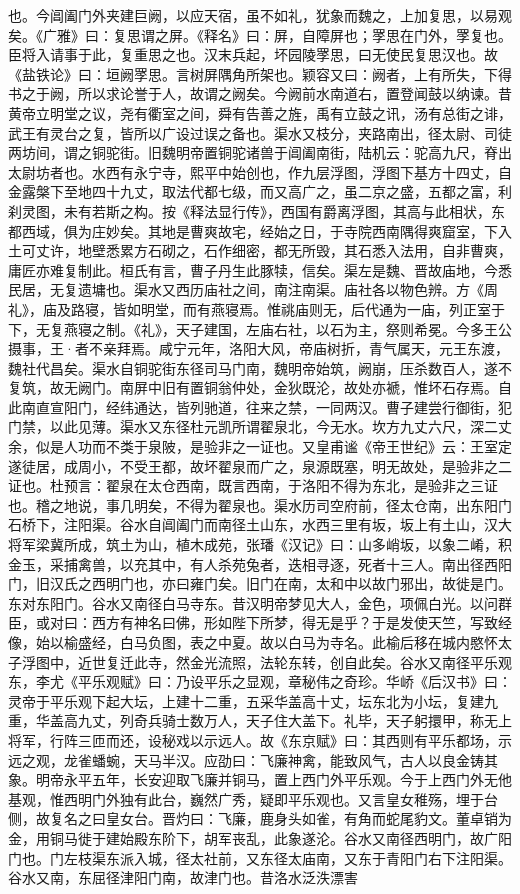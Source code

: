 \documentclass[12pt,UTF8]{ctexbook}
\begin{document}
也。今阊阖门外夹建巨阙，以应天宿，虽不如礼，犹象而魏之，上加复思，以易观矣。《广雅》曰：复思谓之屏。《释名》曰：屏，自障屏也；罦思在门外，罦复也。臣将入请事于此，复重思之也。汉末兵起，坏园陵罦思，曰无使民复思汉也。故《盐铁论》曰：垣阙罦思。言树屏隅角所架也。颖容又曰：阙者，上有所失，下得书之于阙，所以求论誉于人，故谓之阙矣。今阙前水南道右，置登闻鼓以纳谏。昔黄帝立明堂之议，尧有衢室之间，舜有告善之旌，禹有立鼓之讯，汤有总街之诽，武王有灵台之复，皆所以广设过误之备也。渠水又枝分，夹路南出，径太尉、司徒两坊间，谓之铜驼街。旧魏明帝置铜驼诸兽于阊阖南街，陆机云：驼高九尺，脊出太尉坊者也。水西有永宁寺，熙平中始创也，作九层浮图，浮图下基方十四丈，自金露槃下至地四十九丈，取法代都七级，而又高广之，虽二京之盛，五都之富，利刹灵图，未有若斯之构。按《释法显行传》，西国有爵离浮图，其高与此相状，东都西域，俱为庄妙矣。其地是曹爽故宅，经始之日，于寺院西南隅得爽窟室，下入土可丈许，地壁悉累方石砌之，石作细密，都无所毁，其石悉入法用，自非曹爽，庸匠亦难复制此。桓氏有言，曹子丹生此豚犊，信矣。渠左是魏、晋故庙地，今悉民居，无复遗墉也。渠水又西历庙社之间，南注南渠。庙社各以物色辨。方《周礼》，庙及路寝，皆如明堂，而有燕寝焉。惟祧庙则无，后代通为一庙，列正室于下，无复燕寝之制。《礼》，天子建国，左庙右社，以石为主，祭则希冕。今多王公摄事，王·者不亲拜焉。咸宁元年，洛阳大风，帝庙树折，青气属天，元王东渡，魏社代昌矣。渠水自铜驼街东径司马门南，魏明帝始筑，阙崩，压杀数百人，遂不复筑，故无阙门。南屏中旧有置铜翁仲处，金狄既沦，故处亦褫，惟坏石存焉。自此南直宣阳门，经纬通达，皆列驰道，往来之禁，一同两汉。曹子建尝行御街，犯门禁，以此见薄。渠水又东径杜元凯所谓翟泉北，今无水。坎方九丈六尺，深二丈余，似是人功而不类于泉陂，是验非之一证也。又皇甫谧《帝王世纪》云：王室定遂徒居，成周小，不受王都，故坏翟泉而广之，泉源既塞，明无故处，是验非之二证也。杜预言：翟泉在太仓西南，既言西南，于洛阳不得为东北，是验非之三证也。稽之地说，事几明矣，不得为翟泉也。渠水历司空府前，径太仓南，出东阳门石桥下，注阳渠。谷水自阊阖门而南径土山东，水西三里有坂，坂上有土山，汉大将军梁冀所成，筑土为山，植木成苑，张璠《汉记》曰：山多峭坂，以象二崤，积金玉，采捕禽兽，以充其中，有人杀苑兔者，迭相寻逐，死者十三人。南出径西阳门，旧汉氏之西明门也，亦曰雍门矣。旧门在南，太和中以故门邪出，故徙是门。东对东阳门。谷水又南径白马寺东。昔汉明帝梦见大人，金色，项佩白光。以问群臣，或对曰：西方有神名曰佛，形如陛下所梦，得无是乎？于是发使天竺，写致经像，始以榆盛经，白马负图，表之中夏。故以白马为寺名。此榆后移在城内愍怀太子浮图中，近世复迁此寺，然金光流照，法轮东转，创自此矣。谷水又南径平乐观东，李尤《平乐观赋》曰：乃设平乐之显观，章秘伟之奇珍。华峤《后汉书》曰：灵帝于平乐观下起大坛，上建十二重，五采华盖高十丈，坛东北为小坛，复建九重，华盖高九丈，列奇兵骑士数万人，天子住大盖下。礼毕，天子躬擐甲，称无上将军，行阵三匝而还，设秘戏以示远人。故《东京赋》曰：其西则有平乐都场，示远之观，龙雀蟠蜿，天马半汉。应劭曰：飞廉神禽，能致风气，古人以良金铸其象。明帝永平五年，长安迎取飞廉并铜马，置上西门外平乐观。今于上西门外无他基观，惟西明门外独有此台，巍然广秀，疑即平乐观也。又言皇女稚殇，埋于台侧，故复名之曰皇女台。晋灼曰：飞廉，鹿身头如雀，有角而蛇尾豹文。董卓销为金，用铜马徙于建始殿东阶下，胡军丧乱，此象遂沦。谷水又南径西明门，故广阳门也。门左枝渠东派入城，径太社前，又东径太庙南，又东于青阳门右下注阳渠。谷水又南，东屈径津阳门南，故津门也。昔洛水泛泆漂害
\end{document}
